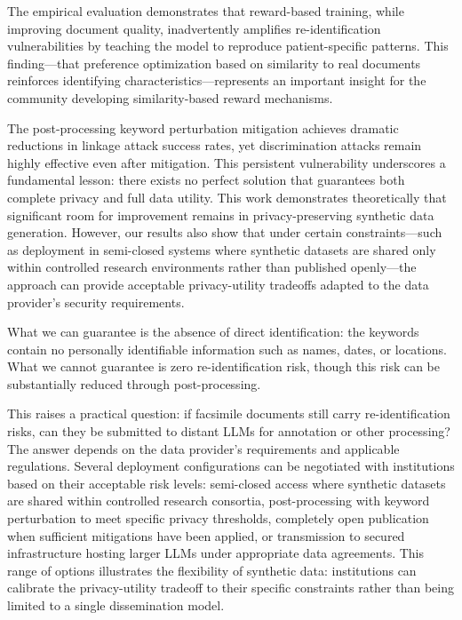 The empirical evaluation demonstrates that reward-based training, while improving document quality, inadvertently amplifies re-identification vulnerabilities by teaching the model to reproduce patient-specific patterns.
This finding—that preference optimization based on similarity to real documents reinforces identifying characteristics—represents an important insight for the community developing similarity-based reward mechanisms.

The post-processing keyword perturbation mitigation achieves dramatic reductions in linkage attack success rates, yet discrimination attacks remain highly effective even after mitigation.
This persistent vulnerability underscores a fundamental lesson: there exists no perfect solution that guarantees both complete privacy and full data utility.
This work demonstrates theoretically that significant room for improvement remains in privacy-preserving synthetic data generation.
However, our results also show that under certain constraints—such as deployment in semi-closed systems where synthetic datasets are shared only within controlled research environments rather than published openly—the approach can provide acceptable privacy-utility tradeoffs adapted to the data provider's security requirements.

What we can guarantee is the absence of direct identification: the keywords contain no personally identifiable information such as names, dates, or locations.
What we cannot guarantee is zero re-identification risk, though this risk can be substantially reduced through post-processing.

This raises a practical question: if facsimile documents still carry re-identification risks, can they be submitted to distant LLMs for annotation or other processing?
The answer depends on the data provider's requirements and applicable regulations.
Several deployment configurations can be negotiated with institutions based on their acceptable risk levels: semi-closed access where synthetic datasets are shared within controlled research consortia, post-processing with keyword perturbation to meet specific privacy thresholds, completely open publication when sufficient mitigations have been applied, or transmission to secured infrastructure hosting larger LLMs under appropriate data agreements.
This range of options illustrates the flexibility of synthetic data: institutions can calibrate the privacy-utility tradeoff to their specific constraints rather than being limited to a single dissemination model.

